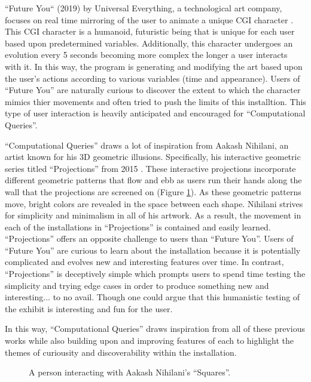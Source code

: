 \documentclass[10pt,twocolumn]{article}
\begin{document}
``Future You`` (2019) by Universal Everything, a technological art company, focuses on real time mirroring of the user to animate a unique CGI character \cite{noauthor_future_2019}. This CGI character is a humanoid, futuristic being that is unique for each user based upon predetermined variables. Additionally, this character undergoes an evolution every 5 seconds becoming more complex the longer a user interacts with it.  In this way, the program is generating and modifying the art based upon the user's actions according to various variables (time and appearance).  Users of ``Future You'' are naturally curious to discover the extent to which the character mimics thier movements and often tried to push the limits of this installtion.  This type of user interaction is heavily anticipated and encouraged for ``Computational Queries''. 

``Computational Queries'' draws a lot of inspiration from Aakash Nihilani, an artist known for his 3D geometric illusions. Specifically, his interactive geometric series titled ``Projections'' from 2015 \cite{noauthor_aakash_nodate}.  These interactive projections incorporate different geometric patterns that flow and ebb as users run their hands along the wall that the projections are screened on (Figure \ref{fig:squares}). As these geometric patterns move, bright colors are revealed in the space between each shape.  Nihilani strives for simplicity and minimalism in all of his artwork.  As a result, the movement in each of the installations in ``Projections'' is contained and easily learned.  ``Projections'' offers an opposite challenge to users than ``Future You''.  Users of ``Future You'' are curious to learn about the installation because it is potentially complicated and evolves new and interesting features over time.  In contrast, ``Projections'' is deceptively simple which prompts users to spend time testing the simplicity and trying edge cases in order to produce something new and interesting... to no avail. Though one could argue that this humanistic testing of the exhibit is interesting and fun for the user.

In this way, ``Computational Queries'' draws inspiration from all of these previous works while also building upon and improving features of each to highlight the themes of curiousity and discoverability within the installation. 

\begin{figure}
\begin{center}
\vspace{.5cm}
\caption{A person interacting with Aakash Nihilani's ``Squares''. }
\label{fig:squares}
\end{center}
\end{figure} 
\end{document}
